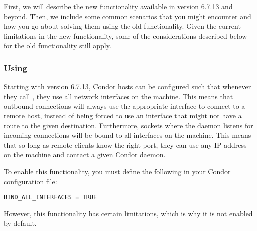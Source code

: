 First, we will describe the new functionality available in version
6.7.13 and beyond. 
Then, we include some common scenarios that you might encounter and
how you go about solving them using the old functionality.
Given the current limitations in the new functionality, some of the
considerations described below for the old functionality still apply. 


\subsubsection{\label{sec:Using-BindAllInterfaces}Using 
}

Starting with version 6.7.13, Condor hosts can be configured such that
whenever they call , they use all network interfaces on
the machine.  
This means that outbound connections will always use the appropriate
interface to connect to a remote host, instead of being forced to use
an interface that might not have a route to the given destination.
Furthermore, sockets where the daemon listens for incoming connections 
will be bound to all interfaces on the machine.
This means that so long as remote clients know the right port, they can
use any IP address on the machine and contact a given Condor daemon.

To enable this functionality, you must define the following in your
Condor configuration file:

\begin{verbatim}
BIND_ALL_INTERFACES = TRUE
\end{verbatim}

However, this functionality has certain limitations, which is why it
is not enabled by default.

